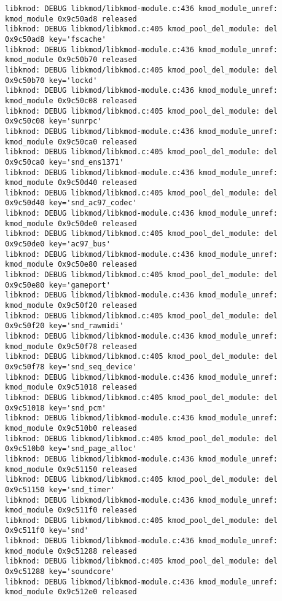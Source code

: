 \documentclass[11pt,a4paper]{article}
\begin{document}
{\begin{shaded}
\begin{verbatim}
libkmod: DEBUG libkmod/libkmod-module.c:436 kmod_module_unref: kmod_module 0x9c50ad8 released
libkmod: DEBUG libkmod/libkmod.c:405 kmod_pool_del_module: del 0x9c50ad8 key='fscache'
libkmod: DEBUG libkmod/libkmod-module.c:436 kmod_module_unref: kmod_module 0x9c50b70 released
libkmod: DEBUG libkmod/libkmod.c:405 kmod_pool_del_module: del 0x9c50b70 key='lockd'
libkmod: DEBUG libkmod/libkmod-module.c:436 kmod_module_unref: kmod_module 0x9c50c08 released
libkmod: DEBUG libkmod/libkmod.c:405 kmod_pool_del_module: del 0x9c50c08 key='sunrpc'
libkmod: DEBUG libkmod/libkmod-module.c:436 kmod_module_unref: kmod_module 0x9c50ca0 released
libkmod: DEBUG libkmod/libkmod.c:405 kmod_pool_del_module: del 0x9c50ca0 key='snd_ens1371'
libkmod: DEBUG libkmod/libkmod-module.c:436 kmod_module_unref: kmod_module 0x9c50d40 released
libkmod: DEBUG libkmod/libkmod.c:405 kmod_pool_del_module: del 0x9c50d40 key='snd_ac97_codec'
libkmod: DEBUG libkmod/libkmod-module.c:436 kmod_module_unref: kmod_module 0x9c50de0 released
libkmod: DEBUG libkmod/libkmod.c:405 kmod_pool_del_module: del 0x9c50de0 key='ac97_bus'
libkmod: DEBUG libkmod/libkmod-module.c:436 kmod_module_unref: kmod_module 0x9c50e80 released
libkmod: DEBUG libkmod/libkmod.c:405 kmod_pool_del_module: del 0x9c50e80 key='gameport'
libkmod: DEBUG libkmod/libkmod-module.c:436 kmod_module_unref: kmod_module 0x9c50f20 released
libkmod: DEBUG libkmod/libkmod.c:405 kmod_pool_del_module: del 0x9c50f20 key='snd_rawmidi'
libkmod: DEBUG libkmod/libkmod-module.c:436 kmod_module_unref: kmod_module 0x9c50f78 released
libkmod: DEBUG libkmod/libkmod.c:405 kmod_pool_del_module: del 0x9c50f78 key='snd_seq_device'
libkmod: DEBUG libkmod/libkmod-module.c:436 kmod_module_unref: kmod_module 0x9c51018 released
libkmod: DEBUG libkmod/libkmod.c:405 kmod_pool_del_module: del 0x9c51018 key='snd_pcm'
libkmod: DEBUG libkmod/libkmod-module.c:436 kmod_module_unref: kmod_module 0x9c510b0 released
libkmod: DEBUG libkmod/libkmod.c:405 kmod_pool_del_module: del 0x9c510b0 key='snd_page_alloc'
libkmod: DEBUG libkmod/libkmod-module.c:436 kmod_module_unref: kmod_module 0x9c51150 released
libkmod: DEBUG libkmod/libkmod.c:405 kmod_pool_del_module: del 0x9c51150 key='snd_timer'
libkmod: DEBUG libkmod/libkmod-module.c:436 kmod_module_unref: kmod_module 0x9c511f0 released
libkmod: DEBUG libkmod/libkmod.c:405 kmod_pool_del_module: del 0x9c511f0 key='snd'
libkmod: DEBUG libkmod/libkmod-module.c:436 kmod_module_unref: kmod_module 0x9c51288 released
libkmod: DEBUG libkmod/libkmod.c:405 kmod_pool_del_module: del 0x9c51288 key='soundcore'
libkmod: DEBUG libkmod/libkmod-module.c:436 kmod_module_unref: kmod_module 0x9c512e0 released

\end{verbatim}
\end{shaded}}
\end{document}
